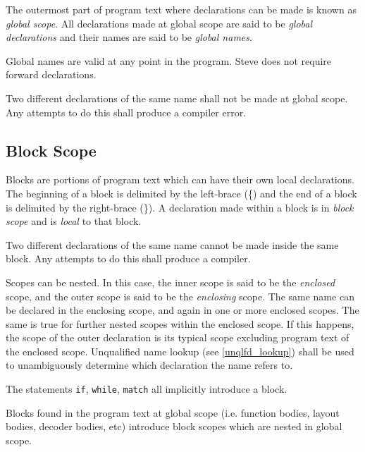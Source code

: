 The outermost part of program text where declarations can be made is known as \textit{global scope}. All declarations made at global scope are said to be \textit{global declarations} and their names are said to be \textit{global names}.

Global names are valid at any point in the program. Steve does not require forward declarations. 

Two different declarations of the same name shall not be made at global scope. Any attempts to do this shall produce a compiler error.

\subsection{Block Scope} \label{block_scope}

Blocks are portions of program text which can have their own local declarations. The beginning of a block is delimited by the left-brace (\{) and the end of a block is delimited by the right-brace (\}). A declaration made within a block is in \textit{block scope} and is \textit{local} to that block.

Two different declarations of the same name cannot be made inside the same block. Any attempts to do this shall produce a compiler. 

Scopes can be nested. In this case, the inner scope is said to be the \textit{enclosed} scope, and the outer scope is said to be the \textit{enclosing} scope. The same name can be declared in the enclosing scope, and again in one or more enclosed scopes. The same is true for further nested scopes within the enclosed scope. If this happens, the scope of the outer declaration is its typical scope excluding program text of the enclosed scope. Unqualified name lookup (see \ref{unqlfd_lookup}) shall be used to unambiguously determine which declaration the name refers to. 

The statements \texttt{if}, \texttt{while}, \texttt{match} all implicitly introduce a block.


Blocks found in the program text at global scope (i.e. function bodies, layout bodies, decoder bodies, etc) introduce block scopes which are nested in global scope.

